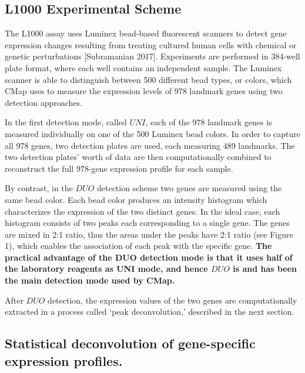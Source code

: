 \documentclass[]{article}
\begin{document}
\hypertarget{l1000-experimental-scheme}{%
\subsection{L1000 Experimental Scheme}\label{l1000-experimental-scheme}}

The L1000 assay uses Luminex bead-based fluorescent scanners to detect
gene expression changes resulting from treating cultured human cells
with chemical or genetic perturbations {[}Subramanian 2017{]}.
Experiments are performed in 384-well plate format, where each well
contains an independent sample. The Luminex scanner is able to
distinguish between 500 different bead types, or colors, which CMap uses
to measure the expression levels of 978 landmark genes using two
detection approaches.

In the first detection mode, called \(UNI\), each of the 978 landmark
genes is measured individually on one of the 500 Luminex bead colors. In
order to capture all 978 genes, two detection plates are used, each
measuring 489 landmarks. The two detection plates' worth of data are
then computationally combined to reconstruct the full 978-gene
expression profile for each sample.

By contrast, in the \(DUO\) detection scheme two genes are measured
using the same bead color. Each bead color produces an intensity
histogram which characterizes the expression of the two distinct genes.
In the ideal case, each histogram consists of two peaks each
corresponding to a single gene. The genes are mixed in 2:1 ratio, thus
the areas under the peaks have 2:1 ratio (see Figure 1), which enables
the association of each peak with the specific gene. \textbf{The
practical advantage of the DUO detection mode is that it uses half of
the laboratory reagents as UNI mode, and hence \(DUO\) is and has been
the main detection mode used by CMap.}

After \(DUO\) detection, the expression values of the two genes are
computationally extracted in a process called `peak deconvolution,'
described in the next section.

\hypertarget{statistical-deconvolution-of-gene-specific-expression-profiles.}{%
\subsection{Statistical deconvolution of gene-specific expression
profiles.}\label{statistical-deconvolution-of-gene-specific-expression-profiles.}}
\end{document}
